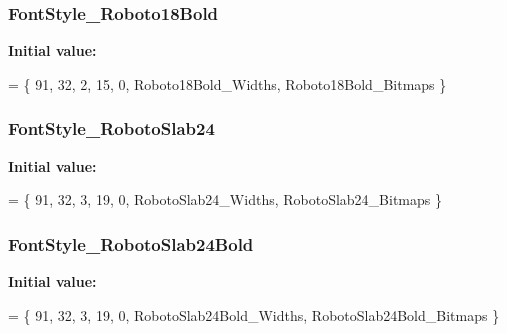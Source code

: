 \subsubsection[{Font\+Style\+\_\+\+Roboto18\+Bold}]{ Font\+Style\+\_\+\+Roboto18\+Bold}\label{fontlibrary_8c_a9e84a3debfed6104fca08b961963fb8d}
{\bfseries Initial value\+:}
\begin{DoxyCode}
=
\{
    91, 
    32, 
    2, 
    15, 
    0, 
    Roboto18Bold\_Widths,
    Roboto18Bold\_Bitmaps
\}
\end{DoxyCode}
\subsubsection[{Font\+Style\+\_\+\+Roboto\+Slab24}]{ Font\+Style\+\_\+\+Roboto\+Slab24}\label{fontlibrary_8c_a1ded0a40c4e30e5c205ba5c1d7157e11}
{\bfseries Initial value\+:}
\begin{DoxyCode}
=
\{
    91, 
    32, 
    3, 
    19, 
    0, 
    RobotoSlab24\_Widths,
    RobotoSlab24\_Bitmaps
\}
\end{DoxyCode}
\subsubsection[{Font\+Style\+\_\+\+Roboto\+Slab24\+Bold}]{ Font\+Style\+\_\+\+Roboto\+Slab24\+Bold}\label{fontlibrary_8c_af06d6a4b7878f7ddcaf37b6f72e2a921}
{\bfseries Initial value\+:}
\begin{DoxyCode}
=
\{
    91, 
    32, 
    3, 
    19, 
    0, 
    RobotoSlab24Bold\_Widths,
    RobotoSlab24Bold\_Bitmaps
\}
\end{DoxyCode}
